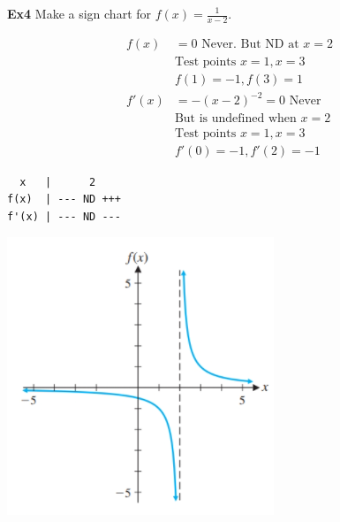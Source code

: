 \documentclass[14pt]{extarticle}
\begin{document}
\textbf{Ex4}
Make a sign chart for $f(x) = \frac{1}{x-2}$.	
\begin{multicols}{2}
	\begin{align*}
		f(x) &= 0 \text{ Never. But ND at } x=2 \\
		& \text{Test points } x =1, x=3 \\
		&f(1)= -1, f(3) = 1 \\
		f'(x) &= -(x-2)^{-2} = 0 \text{ Never}\\
		&\text{But is undefined when } x=2 \\
		& \text{Test points } x =1, x=3 \\
		&f'(0)= -1, f'(2) = -1
	\end{align*}
\begin{verbatim}
  x   |      2
f(x)  | --- ND +++
f'(x) | --- ND ---
\end{verbatim}
	\vfill\null
	\columnbreak 
	\includegraphics[width=1\linewidth]{11-1-a8}
\end{multicols}
\end{document}
